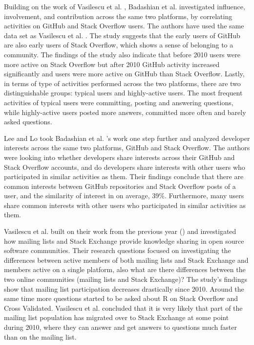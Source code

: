         Building on the work of Vasilescu et al. \cite{vasilescu2013stackoverflow}, Badashian et al. \cite{badashian2014involvement} investigated influence, involvement, and contribution across the same two platforms, by correlating activities on GitHub and Stack Overflow users. The authors have used the same data set as Vasilescu et al. \cite{vasilescu2013stackoverflow}. The study suggests that the early users of GitHub are also early users of Stack Overflow, which shows a sense of belonging to a community. The findings of the study also indicate that before 2010 users were more active on Stack Overflow but after 2010 GitHub activity increased significantly and users were more active on GitHub than Stack Overflow. Lastly, in terms of type of activities performed across the two platforms, there are two distinguishable groups: typical users and highly-active users. The most frequent activities of typical users were committing, posting and answering questions, while highly-active users posted more answers, committed more often and barely asked questions. 
        
        Lee and Lo \cite{lee2017github} took Badashian et al. \cite{badashian2014involvement}'s work one step further and analyzed developer interests across the same two platforms, GitHub and Stack Overflow. The authors were looking into whether developers share interests across their GitHub and Stack Overflow accounts, and do developers share interests with other users who participated in similar activities as them. Their findings conclude that there are common interests between GitHub repositories and Stack Overflow posts of a user, and the similarity of interest in on average, 39\%. Furthermore, many users share common interests with other users who participated in similar activities as them.
        
        Vasilescu et al. \cite{vasilescu2014social} built on their work from the previous year (\cite{vasilescu2013stackoverflow}) and investigated how mailing lists and Stack Exchange provide knowledge sharing in open source software communities. Their research questions focused on investigating the differences between active members of both mailing lists and Stack Exchange and members active on a single platform, also what are there differences between the two online communities (mailing lists and Stack Exchange)? The study's findings show that mailing list participation decreases drastically since 2010. Around the same time more questions started to be asked about R on Stack Overflow and Cross Validated. Vasilescu et al. concluded that it is very likely that part of the mailing list population has migrated over to Stack Exchange at some point during 2010, where they can answer and get answers to questions much faster than on the mailing list.
        
